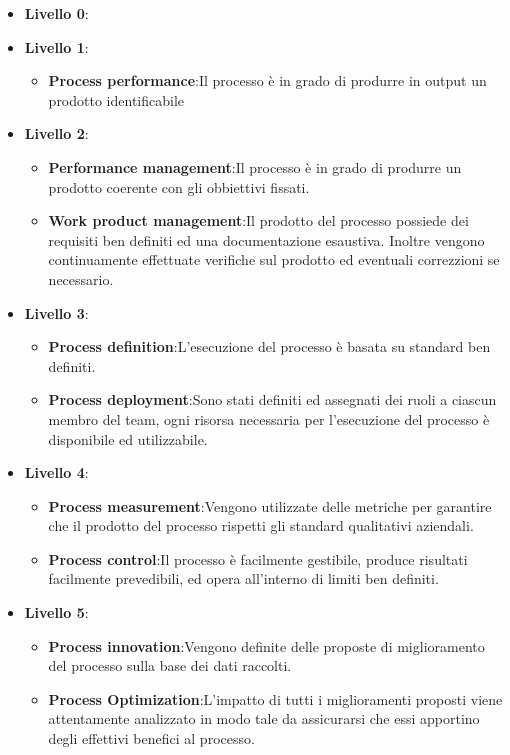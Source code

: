 \begin{itemize}
	\item{\textbf{Livello 0}}:
	\item{\textbf{Livello 1}}:
	\begin{itemize}
		\item{\textbf{Process performance}}:Il processo è in grado di produrre in output un prodotto identificabile 	
	\end{itemize}
	\item{\textbf{Livello 2}}:
	\begin{itemize}
		\item{\textbf{Performance management}}:Il processo è in grado di produrre un prodotto coerente con gli obbiettivi fissati.
		\item{\textbf{Work product management}}:Il prodotto del processo possiede dei requisiti ben definiti ed una documentazione esaustiva. Inoltre vengono continuamente effettuate verifiche sul prodotto ed eventuali correzzioni se necessario.	
	\end{itemize}
	\item{\textbf{Livello 3}}:
	\begin{itemize}
		\item{\textbf{Process definition}}:L'esecuzione del processo è basata su standard ben definiti.
		\item{\textbf{Process deployment}}:Sono stati definiti ed assegnati dei ruoli a ciascun membro del team, ogni risorsa necessaria per l'esecuzione del processo è disponibile ed utilizzabile.
	\end{itemize}
	\item{\textbf{Livello 4}}:
	\begin{itemize}
		\item{\textbf{Process measurement}}:Vengono utilizzate delle metriche per garantire che il prodotto del processo rispetti gli standard qualitativi aziendali. 
		\item{\textbf{Process control}}:Il processo è facilmente gestibile, produce risultati facilmente prevedibili, ed opera all'interno di limiti ben definiti.	
	\end{itemize}
	\item{\textbf{Livello 5}}:
	\begin{itemize}
		\item{\textbf{Process innovation}}:Vengono definite delle proposte di miglioramento del processo sulla base dei dati raccolti.
		\item{\textbf{Process Optimization}}:L'impatto di tutti i miglioramenti proposti viene attentamente analizzato in modo tale da assicurarsi che essi apportino degli effettivi benefici al processo.
	\end{itemize}

\end{itemize}
